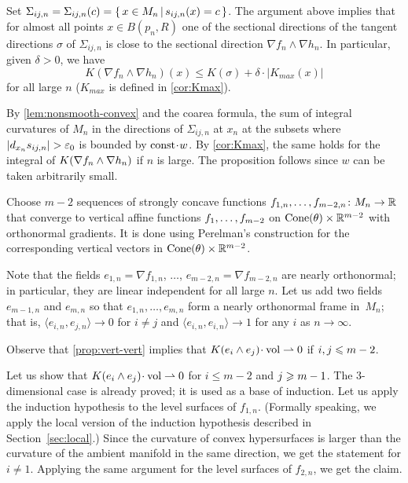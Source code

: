Set $\Sigma_{ij,n}=\Sigma_{ij,n}(c)=\left\{\,x\in M_n\,\middle|\,s_{ij,n}(x)=c\,\right\}$.
The argument above implies that for almost all points $x\in B(p_n,R)$ one of the sectional directions of the tangent directions $\sigma$ of $\Sigma_{ij,n}$ is close to the sectional direction $\nabla f_n\wedge\nabla h_n$.
In particular, given $\delta>0$, we have 
\[K(\nabla f_n\wedge\nabla h_n)(x)\le K(\sigma)+\delta\cdot|K_{max}(x)|\]
for all large $n$ ($K_{max}$ is defined in \ref{cor:Kmax}).

By \ref{lem:nonsmooth-convex} and the coarea formula, the sum of integral curvatures of $M_n$ in the directions of $\Sigma_{ij,n}$ at $x_n$ at the subsets where $|d_{x_n}s_{ij,n}|>\eps_0$ is bounded by $\const\cdot w$.
By \ref{cor:Kmax}, the same holds for the integral of $K(\nabla f_n\zz\wedge\nabla h_n)$ if $n$ is large.
The proposition follows since $w$ can be taken arbitrarily small.
\qeds


Choose $m-2$ sequences of strongly concave functions $f_{1,n},\zz\dots, f_{m-2,n}\: M_n\to \RR$ that converge to vertical affine functions $f_1,\zz\dots,f_{m-2}$ on  $\operatorname{Cone}(\theta)\times \mathbb{R}^{m-2}$ with orthonormal gradients.
It is done using Perelman's construction \cite[7.1.1 and 7.2.3]{petrunin-conc} for the corresponding vertical vectors in $\operatorname{Cone}(\theta)\times \mathbb{R}^{m-2}$.

Note that the fields $e_{1,n}=\nabla f_{1,n}$, $\dots$, $e_{m-2,n}=\nabla f_{m-2,n}$ are nearly orthonormal;
in particular, they are linear independent for all large $n$.
Let us add two fields $e_{m-1,n}$ and $e_{m,n}$  so that $e_{1,n},\dots, e_{m,n}$ form a nearly orthonormal frame in~$M_n$;
that is, $\langle e_{i,n}, e_{j,n}\rangle\to 0$ for $i\ne j$ and $\langle e_{i,n}, e_{i,n}\rangle\to 1$ for any $i$ as $n\to\infty$.

Observe that \ref{prop:vert-vert} implies that $K(e_i\wedge e_j)\cdot\vol\rightharpoonup 0$ if $i,j\zz\le m-2$.

Let us show that $K(e_i\wedge e_j)\cdot\vol\rightharpoonup 0$ for $i\le m-2$ and $j\zz\ge m\zz-1$.
The $3$-dimensional case is already proved; it is used as a base of induction.
Let us apply the induction hypothesis to the level surfaces of $f_{1,n}$.
(Formally speaking, we apply the local version of the induction hypothesis described in Section~\ref{sec:local}.)
Since the curvature of convex hypersurfaces is larger than the curvature of the ambient manifold in the same direction, we get the statement for $i\ne 1$.
Applying the same argument for the level surfaces of $f_{2,n}$, we get the claim.


